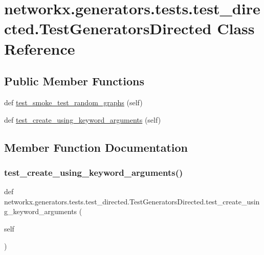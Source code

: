 \hypertarget{classnetworkx_1_1generators_1_1tests_1_1test__directed_1_1TestGeneratorsDirected}{}\section{networkx.\+generators.\+tests.\+test\+\_\+directed.\+Test\+Generators\+Directed Class Reference}
\label{classnetworkx_1_1generators_1_1tests_1_1test__directed_1_1TestGeneratorsDirected}
\subsection*{Public Member Functions}
\begin{DoxyCompactItemize}
\item 
def \hyperlink{classnetworkx_1_1generators_1_1tests_1_1test__directed_1_1TestGeneratorsDirected_ad50bc05185fcd04c2454b2519913b068}{test\+\_\+smoke\+\_\+test\+\_\+random\+\_\+graphs} (self)
\item 
def \hyperlink{classnetworkx_1_1generators_1_1tests_1_1test__directed_1_1TestGeneratorsDirected_ae807dbfab51e1a4ff0fb6fe96537aea8}{test\+\_\+create\+\_\+using\+\_\+keyword\+\_\+arguments} (self)
\end{DoxyCompactItemize}


\subsection{Member Function Documentation}
\mbox{\label{classnetworkx_1_1generators_1_1tests_1_1test__directed_1_1TestGeneratorsDirected_ae807dbfab51e1a4ff0fb6fe96537aea8}} 
\subsubsection{\texorpdfstring{test\+\_\+create\+\_\+using\+\_\+keyword\+\_\+arguments()}{test\_create\_using\_keyword\_arguments()}}
{\footnotesize\ttfamily def networkx.\+generators.\+tests.\+test\+\_\+directed.\+Test\+Generators\+Directed.\+test\+\_\+create\+\_\+using\+\_\+keyword\+\_\+arguments (\begin{DoxyParamCaption}\item[{}]{self }\end{DoxyParamCaption})}

